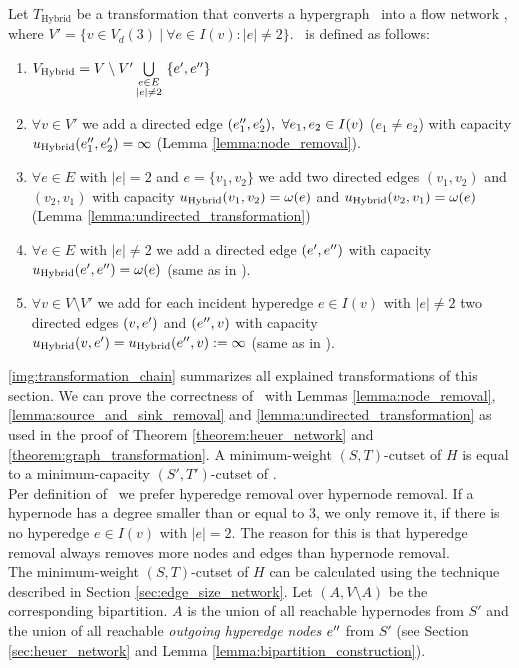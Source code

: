 \begin{definition}
Let $T_{\text{Hybrid}}$ be a transformation that converts a hypergraph \HypergraphDef~into 
a flow network \Hybrid, where $V' = \{v \in V_d(3)\ |\ \forall e \in I(v): |e| \neq 2\}$. 
\ShortHybrid~is defined as follows:
\begin{enumerate}
\item $V_{\text{Hybrid}} = V\setminus V' \bigcup\limits_{\substack{e \in E \\ |e| \neq 2}}\ \{e', e''\}$
\item $\forall v \in V'$ we add a directed edge $(e_1'', e_2'),\ \forall e_1, e_2 \in I(v)$ 
      ($e_1 \neq e_2$) with capacity $u_{\text{Hybrid}}(e_1'', e_2') = \infty$ (Lemma \ref{lemma:node_removal}).
\item $\forall e \in E$ with $|e| = 2$ and $e = \{v_1,v_2\}$ we add 
      two directed edges $(v_1,v_2)$ and $(v_2,v_1)$ with capacity $u_{\text{Hybrid}}(v_1,v_2) = \omega(e)$
      and $u_{\text{Hybrid}}(v_2,v_1) = \omega(e)$ (Lemma \ref{lemma:undirected_transformation})
\item $\forall e \in E$ with $|e| \neq 2$ we add a directed edge $(e',e'')$
      with capacity $u_{\text{Hybrid}}(e',e'') = \omega(e)$ (same as in ).
\item $\forall v \in V\setminus V'$ we add for each incident hyperedge $e \in I(v)$ with $|e| \neq 2$ 
      two directed edges $(v,e')$ and $(e'',v)$ with capacity 
      $u_{\text{Hybrid}}(v,e') = u_{\text{Hybrid}}(e'',v) := \infty$ (same as in ).
\end{enumerate} 
\end{definition}

\autoref{img:transformation_chain} summarizes all explained transformations of this section.
We can prove the correctness of \ShortHybrid~with Lemmas \ref{lemma:node_removal}, \ref{lemma:source_and_sink_removal}
and \ref{lemma:undirected_transformation} as used in the proof of Theorem \ref{theorem:heuer_network}
and \ref{theorem:graph_transformation}. A minimum-weight $(S,T)$-cutset of $H$ is equal to a
minimum-capacity $(S',T')$-cutset of \ShortHybrid. \\
Per definition of \ShortHybrid~we prefer hyperedge removal over hypernode removal. If
a hypernode has a degree smaller than or equal to $3$, we only remove it, if there is no hyperedge
$e \in I(v)$ with $|e| = 2$. The reason for this is that hyperedge removal always removes more nodes
and edges than hypernode removal. \\
The minimum-weight $(S,T)$-cutset of $H$ can be calculated using the technique described in Section
\ref{sec:edge_size_network}. Let $(A,V\setminus A)$ be the corresponding bipartition.
$A$ is the union of all reachable hypernodes from $S'$ and the union of
all reachable \emph{outgoing hyperedge nodes} $e''$ from $S'$ (see Section \ref{sec:heuer_network} 
and Lemma \ref{lemma:bipartition_construction}). 
